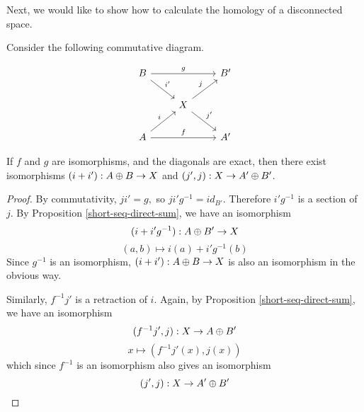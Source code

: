 Next, we would like to show how to calculate the homology of a disconnected space.

\begin{lemma}\label{dsum-lemma}
Consider the following commutative diagram.

\[\begin{tikzcd}
B \arrow[rr, "g"] \arrow[rd, "i'"] &                                    & B' \\
                                   & X \arrow[ru, "j"] \arrow[rd, "j'"] &    \\
A \arrow[ru, "i"] \arrow[rr, "f"]  &                                    & A'
\end{tikzcd}\]

If $f$ and $g$ are isomorphisms, and the diagonals are exact, then there exist isomorphisms $(i+i'):A\oplus B\rightarrow X$ and $(j',j):X\rightarrow A'\oplus B'$.
\end{lemma}
\begin{proof}
By commutativity, $ji'=g,$ so $ji'g^{-1}=id_{B'}$. Therefore $i'g^{-1}$ is a section of $j$. By Proposition \ref{short-seq-direct-sum}, we have an isomorphism $$(i+i'g^{-1}):A\oplus B'\rightarrow X$$
$$(a,b)\mapsto i(a)+i'g^{-1}(b)$$
Since $g^{-1}$ is an isomorphism, $(i+i'):A\oplus B\rightarrow X$ is also an isomorphism in the obvious way.

Similarly, $f^{-1}j'$ is a retraction of $i$. Again, by Proposition \ref{short-seq-direct-sum}, we have an isomorphism $$(f^{-1}j',j):X\rightarrow A\oplus B'$$
$$x\mapsto (f^{-1}j'(x),j(x))$$
which since $f^{-1}$ is an isomorphism also gives an isomorphism 
$$(j',j):X\rightarrow A'\oplus B'$$
\end{proof}


